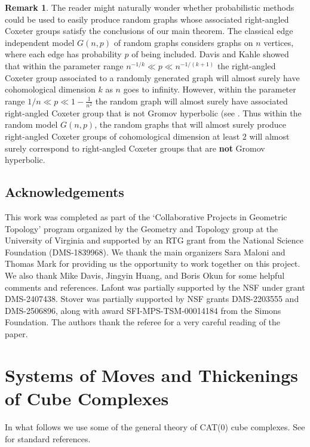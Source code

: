 \documentclass[12pt, letterpaper]{article}
\theoremstyle{plain}
\theoremstyle{definition}
\newtheorem{rmk}[thm]{Remark}
\begin{document}
\begin{rmk}
    The reader might naturally wonder whether probabilistic methods could be used to easily produce random graphs whose associated right-angled Coxeter groups satisfy the conclusions of our main theorem. The classical edge independent model $G(n,p)$ of random graphs considers graphs on $n$ vertices, where each edge has probability $p$ of being included. Davis and Kahle \cite{DavisKahle} showed that within the parameter range $n^{-1/k}\ll p \ll n^{-1/(k+1)}$ the right-angled Coxeter group associated to a randomly generated graph will almost surely have cohomological dimension $k$ as $n$ goes to infinity. However, within the parameter range $1/n \ll p \ll 1-\frac{1}{n^2}$ the random graph will almost surely have associated right-angled Coxeter group that is not Gromov hyperbolic (see \cite[Cor.\ 2.2]{CharneyFarber}. Thus within the random model $G(n,p)$, the random graphs that will almost surely produce right-angled Coxeter groups of cohomological dimension at least $2$ will almost surely correspond to right-angled Coxeter groups that are \textbf{not} Gromov hyperbolic. 
\end{rmk}

\subsection*{Acknowledgements}  This work was completed as part of the `Collaborative Projects in Geometric Topology' program organized by the Geometry and Topology group at the University of Virginia and supported by an RTG grant from the National Science Foundation (DMS-1839968). We thank the main organizers Sara Maloni and Thomas Mark for providing us the opportunity to work together on this project. We also thank Mike Davis, Jingyin Huang, and Boris Okun for some helpful comments and references. Lafont was partially supported by the NSF under grant DMS-2407438. Stover was partially supported by NSF grants DMS-2203555 and DMS-2506896, along with award SFI-MPS-TSM-00014184 from the Simons Foundation. The authors thank the referee for a very careful reading of the paper.

\section{Systems of Moves and Thickenings of Cube Complexes}

In what follows we use some of the general theory of CAT(0) cube complexes. See \cite{Davis, Sageev} for standard references.
\end{document}
